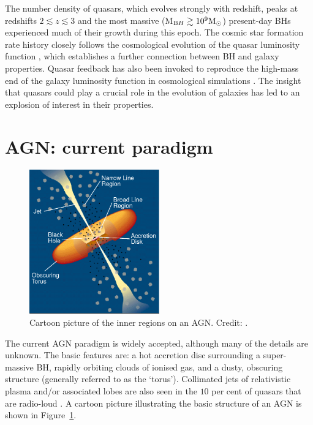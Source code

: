 The number density of quasars, which evolves strongly with redshift, peaks at redshifts $2 \lesssim z \lesssim 3$ \citep[e.g.][]{brandt05,richards06b} and the most massive (M$_{\mathrm BH} \gtrsim 10^9{{{\rm M_\odot}}}$) present-day BHs experienced much of their growth during this epoch.  
The cosmic star formation rate history closely follows the cosmological evolution of the quasar luminosity function \citep[e.g.][]{boyle98}, which establishes a further connection between BH and galaxy properties.
Quasar feedback has also been invoked to reproduce the high-mass end of the galaxy luminosity function in cosmological simulations \citep[e.g.][]{kauffmann00}.
The insight that quasars could play a crucial role in the evolution of galaxies has led to an explosion of interest in their properties. 

\section{AGN: current paradigm}

\begin{figure}
  \centering
  \includegraphics[width=0.5\textwidth]{figures/chapter05/urry_model}
  \caption[{Illustration of the physical structure of an AGN in a simple orientation-based unification model.}]{Cartoon picture of the inner regions on an AGN. Credit: \citet{urry95}.}
  \label{fig:agnmodel}
\end{figure}

The current AGN paradigm is widely accepted, although many of the details are unknown. 
The basic features are: a hot accretion disc surrounding a super-massive BH, rapidly orbiting clouds of ionised gas, and a dusty, obscuring structure (generally referred to as the `torus'). 
Collimated jets of relativistic plasma and/or associated lobes are also seen in the $10$ per cent of quasars that are radio-loud \citep[e.g.][]{peterson97}. 
A cartoon picture illustrating the basic structure of an AGN is shown in Figure~\ref{fig:agnmodel}. 

